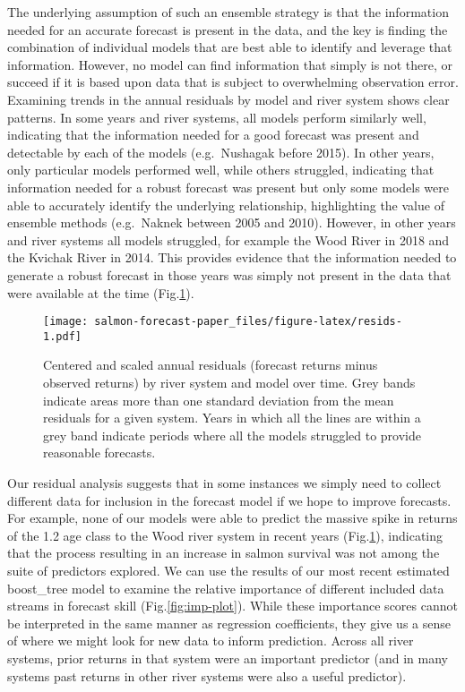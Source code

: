 \documentclass[
]{article}
\begin{document}
The underlying assumption of such an ensemble strategy is that the information needed for an accurate forecast is present in the data, and the key is finding the combination of individual models that are best able to identify and leverage that information. However, no model can find information that simply is not there, or succeed if it is based upon data that is subject to overwhelming observation error. Examining trends in the annual residuals by model and river system shows clear patterns. In some years and river systems, all models perform similarly well, indicating that the information needed for a good forecast was present and detectable by each of the models (e.g.~Nushagak before 2015). In other years, only particular models performed well, while others struggled, indicating that information needed for a robust forecast was present but only some models were able to accurately identify the underlying relationship, highlighting the value of ensemble methods (e.g.~Naknek between 2005 and 2010). However, in other years and river systems all models struggled, for example the Wood River in 2018 and the Kvichak River in 2014. This provides evidence that the information needed to generate a robust forecast in those years was simply not present in the data that were available at the time (Fig.\ref{fig:resids}).

\begin{figure}
\centering
\texttt{[image: salmon-forecast-paper\_files/figure-latex/resids-1.pdf]}
\caption{\label{fig:resids}Centered and scaled annual residuals (forecast returns minus observed returns) by river system and model over time. Grey bands indicate areas more than one standard deviation from the mean residuals for a given system. Years in which all the lines are within a grey band indicate periods where all the models struggled to provide reasonable forecasts.}
\end{figure}

Our residual analysis suggests that in some instances we simply need to collect different data for inclusion in the forecast model if we hope to improve forecasts. For example, none of our models were able to predict the massive spike in returns of the 1.2 age class to the Wood river system in recent years (Fig.\ref{fig:resids}), indicating that the process resulting in an increase in salmon survival was not among the suite of predictors explored. We can use the results of our most recent estimated boost\_tree model to examine the relative importance of different included data streams in forecast skill (Fig.\ref{fig:imp-plot}). While these importance scores cannot be interpreted in the same manner as regression coefficients, they give us a sense of where we might look for new data to inform prediction. Across all river systems, prior returns in that system were an important predictor (and in many systems past returns in other river systems were also a useful predictor).
\end{document}
